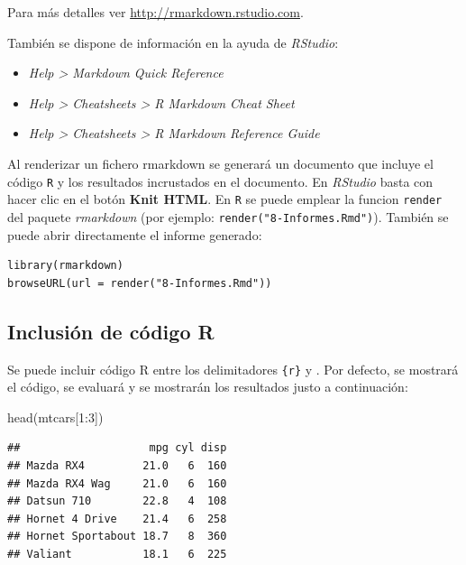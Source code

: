 \documentclass[
]{book}
\newenvironment{Shaded}{\begin{snugshade}}{\end{snugshade}}
\newcommand{\DecValTok}[1]{\textcolor[rgb]{0.00,0.00,0.81}{#1}}
\newcommand{\FunctionTok}[1]{\textcolor[rgb]{0.00,0.00,0.00}{#1}}
\newcommand{\NormalTok}[1]{#1}
\newcommand{\SpecialCharTok}[1]{\textcolor[rgb]{0.00,0.00,0.00}{#1}}
\theoremstyle{break}
\begin{document}
Para más detalles ver \url{http://rmarkdown.rstudio.com}.

También se dispone de información en la ayuda de \emph{RStudio}:

\begin{itemize}
\item
  \emph{Help \textgreater{} Markdown Quick Reference}
\item
  \emph{Help \textgreater{} Cheatsheets \textgreater{} R Markdown Cheat Sheet}
\item
  \emph{Help \textgreater{} Cheatsheets \textgreater{} R Markdown Reference Guide}
\end{itemize}

Al renderizar un fichero rmarkdown se generará un documento que incluye el código \texttt{R}
y los resultados incrustados en el documento.
En \emph{RStudio} basta con hacer clic en el botón \textbf{Knit HTML}.
En \texttt{R} se puede emplear la funcion \texttt{render} del paquete \emph{rmarkdown}
(por ejemplo: \texttt{render("8-Informes.Rmd")}).
También se puede abrir directamente el informe generado:

\begin{verbatim}
library(rmarkdown)
browseURL(url = render("8-Informes.Rmd"))
\end{verbatim}

\hypertarget{inclusiuxf3n-de-cuxf3digo-r}{%
\subsection{Inclusión de código R}\label{inclusiuxf3n-de-cuxf3digo-r}}

Se puede incluir código R entre los delimitadores \texttt{\textasciigrave{}\textasciigrave{}\textasciigrave{}\{r\}} y \texttt{\textasciigrave{}\textasciigrave{}\textasciigrave{}}. Por defecto, se mostrará el código, se evaluará y se mostrarán los resultados justo a continuación:

\begin{Shaded}
\begin{Highlighting}[]
\FunctionTok{head}\NormalTok{(mtcars[}\DecValTok{1}\SpecialCharTok{:}\DecValTok{3}\NormalTok{])}
\end{Highlighting}
\end{Shaded}

\begin{verbatim}
##                    mpg cyl disp
## Mazda RX4         21.0   6  160
## Mazda RX4 Wag     21.0   6  160
## Datsun 710        22.8   4  108
## Hornet 4 Drive    21.4   6  258
## Hornet Sportabout 18.7   8  360
## Valiant           18.1   6  225
\end{verbatim}
\end{document}
